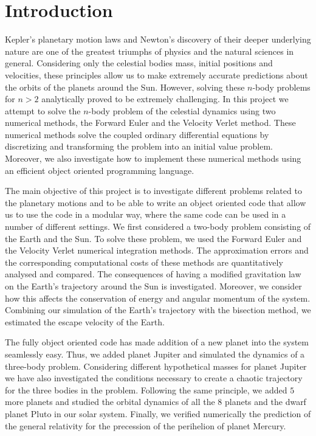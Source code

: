 \documentclass[a4paper]{article}
\begin{document}
\newpage

\section{Introduction}
Kepler's planetary motion laws and Newton's discovery of their deeper underlying nature are one of the greatest triumphs of physics and the natural sciences in general. Considering only the celestial bodies mass, initial positions and velocities, these principles allow us to make extremely accurate predictions about the orbits of the planets around the Sun. However, solving these $n$-body problems for $n>2$ analytically proved to be extremely challenging. In this project we attempt to solve the $n$-body problem of the celestial dynamics using two numerical methods, the Forward Euler and the Velocity Verlet method. These numerical methods solve the coupled ordinary differential equations by discretizing and transforming the problem into an initial value problem. Moreover, we also investigate how to implement these numerical methods using an efficient object oriented programming language. 

The main objective of this project is to investigate different problems related to the planetary motions and to be able to write an object oriented code that allow us to use the code in a modular way, where the same code can be used in a number of different settings. We first considered a two-body problem consisting of the Earth and the Sun. To solve these problem, we used the Forward Euler and the Velocity Verlet numerical integration methods. The approximation errors and the corresponding computational costs of these methods are quantitatively analysed and compared. The consequences of having a modified gravitation law on the Earth's trajectory around the Sun is investigated. Moreover, we consider how this affects the conservation of energy and angular momentum of the system. Combining our simulation of the Earth's trajectory with the bisection method, we estimated the escape velocity of the Earth. 

The fully object oriented code has made addition of a new planet into the system seamlessly easy. Thus, we added planet Jupiter and simulated the dynamics of a three-body problem. Considering different hypothetical masses for planet Jupiter we have also investigated the conditions necessary to create a chaotic trajectory for the three bodies in the problem. Following the same principle, we added $5$ more planets and studied the orbital dynamics of all the $8$ planets and the dwarf planet Pluto in our solar system. Finally, we verified numerically the prediction of the general relativity for the precession of the perihelion of planet Mercury.
\end{document}
